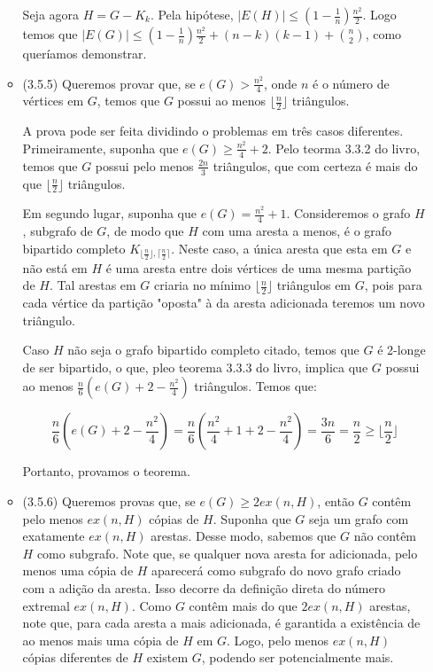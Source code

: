 \documentclass{article}
\begin{document}
\begin{enumerate}
\begin{itemize}
		            Seja agora \(H = G - K_k\). Pela hipótese, \(|E(H)| \leq (1 - \frac{1}{n})\frac{n^2}{2}\).
		            Logo temos que \(|E(G)| \leq (1 - \frac{1}{n})\frac{n^2}{2} + (n-k)(k-1) + \binom{n}{2}\),
		            como queríamos demonstrar.

		      \item (3.5.5)
		            Queremos provar que, se \(e(G) > \frac{n^2}{4}\), onde \(n\) é o número de vértices em \(G\),
		            temos que \(G\) possui ao menos \(\lfloor\frac{n}{2}\rfloor\) triângulos.


		            A prova pode ser feita dividindo o problemas em três casos diferentes. Primeiramente, suponha
		            que \(e(G) \geq \frac{n^2}{4} + 2\). Pelo teorma 3.3.2 do livro, temos que \(G\) possui pelo menos
		            \(\frac{2n}{3}\) triângulos, que com certeza é mais do que \(\lfloor\frac{n}{2}\rfloor\) triângulos.

		            Em segundo lugar, suponha que \(e(G) = \frac{n^2}{4} + 1\). Consideremos o grafo \(H\), subgrafo de \(G\), de modo que
		            \(H\) com uma aresta a menos, é o grafo bipartido completo \(K_{{\lfloor\frac{n}{2}\rfloor}, {\lceil\frac{n}{2}}\rceil}\).
		            Neste caso, a única aresta que esta em \(G\) e não está em \(H\) é uma aresta entre dois vértices de uma mesma
		            partição de \(H\). Tal arestas em \(G\) criaria no mínimo \(\lfloor\frac{n}{2}\rfloor\) triângulos em \(G\), pois para
		            cada vértice da partição "oposta" à da aresta adicionada teremos um novo triângulo.

		            Caso \(H\) não seja o grafo bipartido completo citado, temos que \(G\) é 2-longe de ser bipartido, o que, pleo teorema
		            3.3.3 do livro, implica que \(G\) possui ao menos \(\frac{n}{6}(e(G) + 2 - \frac{n^2}{4})\) triângulos. Temos que:

		            \[\frac{n}{6}(e(G) + 2 - \frac{n^2}{4}) = \frac{n}{6}(\frac{n^2}{4} + 1 + 2 - \frac{n^2}{4}) = \frac{3n}{6} = \frac{n}{2} \geq \lfloor\frac{n}{2}\rfloor\]

		            Portanto, provamos o teorema.


		      \item (3.5.6)
		            Queremos provas que, se \(e(G) \geq 2 ex(n, H)\), então \(G\) contêm pelo menos \(ex(n, H)\) cópias de \(H\).
		            Suponha que \(G\) seja um grafo com exatamente \(ex(n, H)\) arestas. Desse modo, sabemos que \(G\) não contêm \(H\) como subgrafo.
		            Note que, se qualquer nova aresta for adicionada, pelo menos uma cópia de \(H\) aparecerá como subgrafo do novo grafo criado com a adição da aresta.
		            Isso decorre da definição direta do número extremal \(ex(n, H)\). Como \(G\) contêm mais do que \(2 ex(n, H)\) arestas, note que, para cada aresta a mais adicionada, é garantida a existência
		            de ao menos mais uma cópia de \(H\) em \(G\). Logo, pelo menos \(ex(n, H)\) cópias diferentes de \(H\) existem \(G\), podendo ser potencialmente mais.


\end{itemize}
\end{enumerate}
\end{document}
